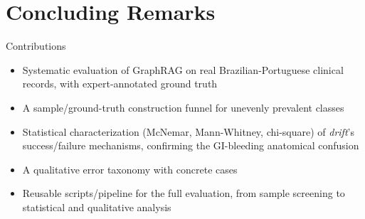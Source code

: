 \documentclass[9pt]{beamer}
\begin{document}
    \section{Concluding Remarks}


    \begin{frame}{Contributions}
        \small
        \begin{itemize}
            \item Systematic evaluation of GraphRAG on real Brazilian-Portuguese clinical records, with expert-annotated ground truth
            \item A sample/ground-truth construction funnel for unevenly prevalent classes
            \item Statistical characterization (McNemar, Mann-Whitney, chi-square) of \textit{drift}'s success/failure mechanisms, confirming the GI-bleeding anatomical confusion
            \item A qualitative error taxonomy with concrete cases
            \item Reusable scripts/pipeline for the full evaluation, from sample screening to statistical and qualitative analysis
        \end{itemize}
    \end{frame}
\end{document}
